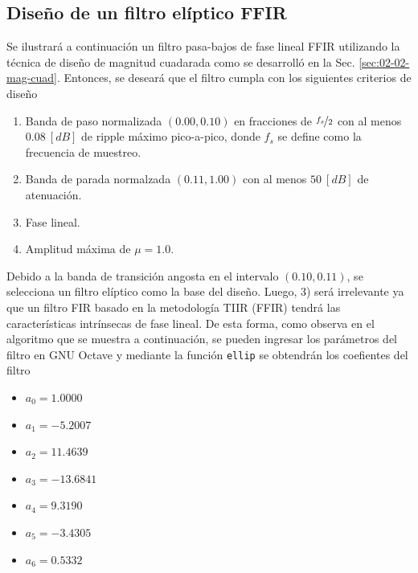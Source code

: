 \subsection{Diseño de un filtro elíptico FFIR}
    Se ilustrará a continuación un filtro pasa-bajos de fase lineal FFIR
    utilizando la técnica de diseño de magnitud cuadarada como se desarrolló en
    la Sec. \ref{sec:02-02-mag-cuad}. Entonces, se deseará que el filtro cumpla
    con los siguientes criterios de diseño


    \begin{enumerate}
      \item Banda de paso normalizada $(0.00,0.10)$ en fracciones de
            $\nicefrac{f_{s}}{2}$ con al menos $0.08 \: [\unit{dB}]$ de ripple
            máximo pico-a-pico, donde $f_{s}$ se define como la frecuencia de
            muestreo.
      \item Banda de parada normalzada $(0.11,1.00)$ con al menos
            $50 \: [\unit{dB}]$ de atenuación.
      \item Fase lineal.
      \item Amplitud máxima de $\mu = 1.0$.

    \end{enumerate}

    Debido a la banda de transición angosta en el intervalo $(0.10,0.11)$, se
    selecciona un filtro elíptico como la base del diseño. Luego, 3) será
    irrelevante ya que un filtro FIR basado en la metodología TIIR (FFIR) tendrá
    las características intrínsecas de fase lineal. De esta forma, como
    observa en el algoritmo que se muestra a continuación, se pueden ingresar
    los parámetros del filtro en GNU Octave y mediante la función
    \lstinline|ellip| se obtendrán los coefientes del filtro

    

    \begin{itemize}
      \item $a_{0} = 1.0000$
      \item $a_{1} = -5.2007$
      \item $a_{2} = 11.4639$
      \item $a_{3} = -13.6841$
      \item $a_{4} = 9.3190$
      \item $a_{5} = -3.4305$
      \item $a_{6} = 0.5332$
    \end{itemize}

